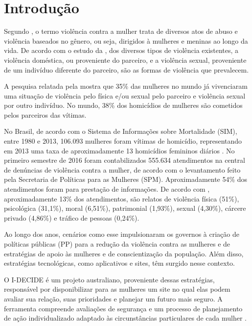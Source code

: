 \chapter[Introdução]{Introdução} \label{cap:introducao}

Segundo , o termo violência contra a mulher trata de
diversos atos de abuso e violência baseados no gênero, ou seja, dirigidos à mulheres e meninas ao longo da vida.
De acordo com o estudo da , dos diversos tipos de violência existentes, a violência doméstica, ou proveniente do parceiro,
e a violência sexual, proveniente de um indivíduo diferente do parceiro, são as formas de violência que prevalecem.

A pesquisa relatada pela  mostra que 35\% das mulheres no mundo já vivenciaram uma situação
de violência pelo física e/ou sexual pelo parceiro e violência sexual por outro indivíduo. No mundo, 38\% dos homicídios de mulheres são cometidos pelos parceiros das vítimas.

No Brasil, de acordo com o Sistema de Informações sobre Mortalidade (SIM), entre 1980 e 2013, 106.093 mulheres foram vítimas de homicídio, representando em 2013 uma taxa de aproximadamente 13 homicídios femininos
diários \cite{mapa_violencia_2015}. 
No primeiro semestre de 2016 foram contabilizados 555.634 atendimentos na central de denúncias 
de violência contra a mulher, de acordo com o levantamento feito pela Secretaria de Políticas para as Mulheres (SPM). 
Aproximadamente 54\% dos atendimentos foram para prestação de informações. De acordo com \cite{portal_180}, aproximadamente 13\% dos atendimentos, são relatos de violência física (51\%), psicológica (31,1\%), moral (6,51\%), patrimonial (1,93\%), sexual (4,30\%), cárcere privado (4,86\%) e tráfico de pessoas (0,24\%).

Ao longo dos anos, cenários como esse impulsionaram os governos à criação de políticas públicas (PP) para a redução da violência contra as mulheres e de estratégias de apoio às mulheres e de conscientização da população. Além disso, estratégias tecnológicas, como aplicativos e sites, têm surgido nesse contexto.

O I-DECIDE é um projeto australiano, proveniente dessas estratégias, responsável por disponibilizar para as mulheres um site no qual elas podem avaliar sua relação, suas prioridades e planejar um futuro mais seguro. A ferramenta compreende avaliações de segurança e um processo de planejamento de ação individualizado adaptado às circunstâncias particulares de cada mulher \cite{idecide}.

